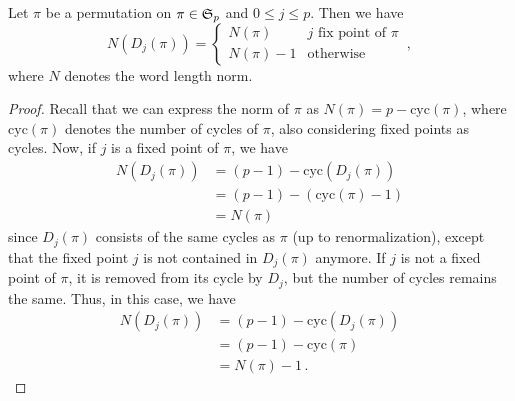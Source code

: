 \begin{lem}
Let $\pi$ be a permutation on $\pi \in \mathfrak S_p$ and $0 \le j \le p$.
Then we have
\[ 
    N(D_j(\pi)) =
        \begin{cases}
            N(\pi)      & j \text{ fix point of } \pi \\
            N(\pi) - 1  & \text{otherwise}
        \end{cases}\,,
\] 
where $N$ denotes the word length norm.

\begin{proof}
Recall that we can express the norm of $\pi$ as $N(\pi) = p - \mathrm{cyc}(\pi)$, 
where $\mathrm{cyc}(\pi)$ denotes the number of cycles of $\pi$, also considering fixed points as cycles. 
Now, if $j$ is a fixed point of $\pi$, we have 
\begin{align*}
N(D_j(\pi))&= (p - 1) - \mathrm{cyc}(D_j(\pi)) \\
           &= (p - 1) - (\mathrm{cyc}(\pi) - 1) \\
           &= N(\pi)
\end{align*}
since $D_j(\pi)$ consists of the same cycles as $\pi$ (up to renormalization), 
except that the fixed point $j$ is not contained in $D_j(\pi)$ anymore.
If $j$ is not a fixed point of $\pi$, it is removed from its cycle by $D_j$, 
but the number of cycles remains the same. 
Thus, in this case, we have
\begin{align*}
N(D_j(\pi)) &= (p - 1) - \mathrm{cyc}(D_j(\pi)) \\
           &= (p - 1) - \mathrm{cyc}(\pi) \\
           &= N(\pi) - 1\,.
\end{align*}
\end{proof}
\end{lem}
